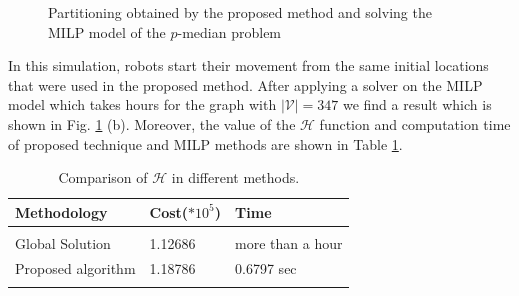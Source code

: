 \documentclass[smallcondensed]{svjour3}
\begin{document}
\begin{figure}[H]
	\centering	
	\caption{Partitioning obtained by the proposed method and solving the MILP model of the $p$-median problem}
	\label{fig:googledeployed}
\end{figure}

In this simulation, robots start their movement from the same initial locations that were used in the proposed method. After applying a solver on the MILP model which takes hours for the graph with $|\mathcal{V}|=347$ we find a result which is shown in Fig. \ref{fig:googledeployed} (b). Moreover, the value of the $\mathcal{H}$ function and computation time of proposed technique and MILP methods are shown in Table \ref{tbl:comparison}.

\begin{table}[t]
\centering
\caption{Comparison of $\mathcal{H}$ in different methods. }
\label{tbl:comparison}
\begin{tabular}{m{2.65cm}m{1.5cm}m{2.4cm}}
Methodology    & Cost($*10^5$) & Time  \\
 \hline\\
 Global Solution   &  1.12686 & more than a hour\\
Proposed algorithm & 1.18786  & 0.6797 sec\\
\hline\\
\end{tabular}
\end{table}
\end{document}
